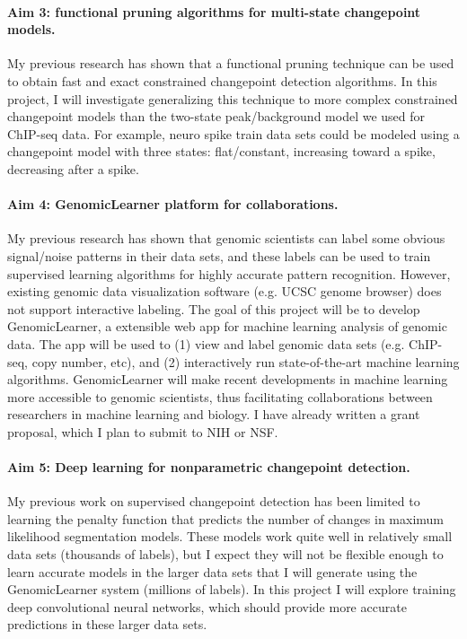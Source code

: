 \documentclass{article}
\begin{document}
\paragraph{Aim 3: functional pruning algorithms for multi-state
  changepoint models.} My previous research has shown that a
functional pruning technique can be used to obtain fast and exact
constrained changepoint detection algorithms. In this project, I will
investigate generalizing this technique to more complex constrained
changepoint models than the two-state peak/background model we used
for ChIP-seq data. For example, neuro spike train data sets could be
modeled using a changepoint model with three states: flat/constant,
increasing toward a spike, decreasing after a spike.

\paragraph{Aim 4: GenomicLearner platform for collaborations.} My previous
research has shown that genomic scientists can label some obvious
signal/noise patterns in their data sets, and these labels can be used
to train supervised learning algorithms for highly accurate pattern
recognition. However, existing genomic data visualization software
(e.g. UCSC genome browser) does not support interactive labeling. The
goal of this project will be to develop GenomicLearner, a extensible
web app for machine learning analysis of genomic data. The app will be
used to (1) view and label genomic data sets (e.g. ChIP-seq, copy
number, etc), and (2) interactively run state-of-the-art machine
learning algorithms. GenomicLearner will make recent developments in
machine learning more accessible to genomic scientists, thus
facilitating collaborations between researchers in machine learning
and biology. I have already written a grant proposal, which I plan to
submit to NIH or NSF.


\paragraph{Aim 5: Deep learning for nonparametric changepoint
  detection.} My previous work on supervised changepoint detection has
been limited to learning the penalty function that predicts the number
of changes in maximum likelihood segmentation models. These models
work quite well in relatively small data sets (thousands of labels),
but I expect they will not be flexible enough to learn accurate models
in the larger data sets that I will generate using the GenomicLearner
system (millions of labels). In this project I will explore training
deep convolutional neural networks, which should provide more accurate
predictions in these larger data sets.



\end{document}
